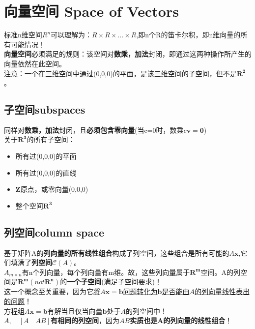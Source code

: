     \section{向量空间 Space of Vectors}
    标准n维空间$R^n$可以理解为：$R \times R \times \dots \times R$,即n个R的笛卡尔积，即n维向量的所有可能情况！
    \\
    \textbf{向量空间}必须满足的规则：该空间对\textbf{数乘，加法}封闭，即通过这两种操作所产生的向量依然在此空间。
    \\
    注意：一个在三维空间中通过(0,0,0)的平面，是该三维空间的子空间，但不是$\bm{R^2}$。\\
    \subsection{子空间subspaces}
    同样对\textbf{数乘，加法}封闭，且\textbf{必须包含零向量}(当c=0时，数乘$c \bm{v}=\bm{0}$)
    \\
    关于$\bm{R^3}$的所有子空间：
    \begin{itemize}
        \item 所有过(0,0,0)的平面
        \item 所有过(0,0,0)的直线
        \item $\bm{Z}$原点，或零向量(0,0,0)
        \item 整个空间$\bm{R^3}$
    \end{itemize}
    \subsection{列空间column space}
    基于矩阵A的\textbf{列向量的所有线性组合}构成了列空间，这些组合是所有可能的$A\bm{x}$,它们填满了\textbf{列空间}$\bm{\mathcal{C}}(A)$。
    \\
    $A_{m\times n}$有n个列向量，每个列向量有m维。故，这些列向量属于$\bm{R^m}$空间。A的列空间是$\bm{R^m}(not \bm{R^n})$的\textbf{一个子空间}(满足子空间要求)！
    \\
    这一个概念至关重要，因为它\underline{将$A\bm{x}=\bm{b}$问题转化为$\bm{b}$是否能由$A$的列向量线性表出的问题}！
    \\
    方程组$A\bm{x}=\bm{b}$有解当且仅当向量$\bm{b}$处于$A$的列空间中！\\
    $A, \quad [A \quad AB]$\textbf{有相同的列空间}，因为$AB$\textbf{实质也是A的列向量的线性组合}！
    \\
